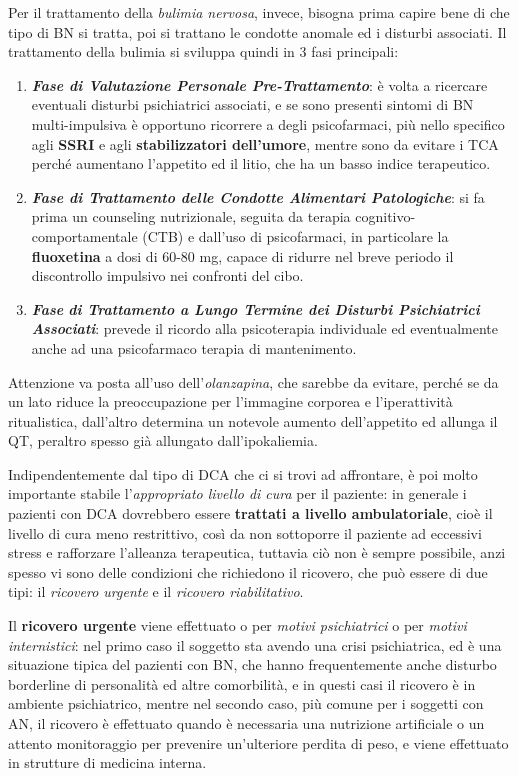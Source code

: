 \documentclass[]{article}
\begin{document}
Per il trattamento della \emph{bulimia nervosa}, invece, bisogna prima
capire bene di che tipo di BN si tratta, poi si trattano le condotte
anomale ed i disturbi associati. Il trattamento della bulimia si
sviluppa quindi in 3 fasi principali:

\begin{enumerate}
\def\labelenumi{\arabic{enumi}.}
\item
  \textbf{\emph{Fase di Valutazione Personale Pre-Trattamento}}: è volta
  a ricercare eventuali disturbi psichiatrici associati, e se sono
  presenti sintomi di BN multi-impulsiva è opportuno ricorrere a degli
  psicofarmaci, più nello specifico agli \textbf{SSRI} e agli
  \textbf{stabilizzatori dell'umore}, mentre sono da evitare i TCA
  perché aumentano l'appetito ed il litio, che ha un basso indice
  terapeutico.
\item
  \textbf{\emph{Fase di Trattamento delle Condotte Alimentari
  Patologiche}}: si fa prima un counseling nutrizionale, seguita da
  terapia cognitivo-comportamentale (CTB) e dall'uso di psicofarmaci, in
  particolare la \textbf{fluoxetina} a dosi di 60-80 mg, capace di
  ridurre nel breve periodo il discontrollo impulsivo nei confronti del
  cibo.
\item
  \emph{\textbf{Fase} \textbf{di Trattamento a Lungo Termine dei
  Disturbi Psichiatrici Associati}}: prevede il ricordo alla
  psicoterapia individuale ed eventualmente anche ad una psicofarmaco
  terapia di mantenimento.
\end{enumerate}

Attenzione va posta all'uso dell'\emph{olanzapina}, che sarebbe da
evitare, perché se da un lato riduce la preoccupazione per l'immagine
corporea e l'iperattività ritualistica, dall'altro determina un notevole
aumento dell'appetito ed allunga il QT, peraltro spesso già allungato
dall'ipokaliemia.

Indipendentemente dal tipo di DCA che ci si trovi ad affrontare, è poi
molto importante stabile l'\emph{appropriato livello di cura} per il
paziente: in generale i pazienti con DCA dovrebbero essere
\textbf{trattati a livello ambulatoriale}, cioè il livello di cura meno
restrittivo, così da non sottoporre il paziente ad eccessivi stress e
rafforzare l'alleanza terapeutica, tuttavia ciò non è sempre possibile,
anzi spesso vi sono delle condizioni che richiedono il ricovero, che può
essere di due tipi: il \emph{ricovero urgente} e il \emph{ricovero
riabilitativo}.

Il \textbf{ricovero urgente} viene effettuato o per \emph{motivi
psichiatrici} o per \emph{motivi internistici}: nel primo caso il
soggetto sta avendo una crisi psichiatrica, ed è una situazione tipica
del pazienti con BN, che hanno frequentemente anche disturbo borderline
di personalità ed altre comorbilità, e in questi casi il ricovero è in
ambiente psichiatrico, mentre nel secondo caso, più comune per i
soggetti con AN, il ricovero è effettuato quando è necessaria una
nutrizione artificiale o un attento monitoraggio per prevenire
un'ulteriore perdita di peso, e viene effettuato in strutture di
medicina interna.
\end{document}
